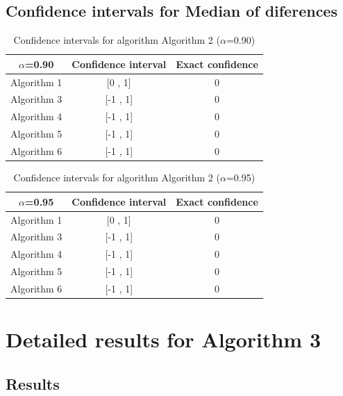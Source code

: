 \documentclass[a4paper,10pt]{article}
\begin{document}
\subsection{Confidence intervals for Median of diferences}

\begin{table}[!htp]
\centering\small
\begin{tabular}{
|c|c|c|}
\hline
 $\alpha$=0.90 & Confidence interval & Exact confidence \\ \hline 
Algorithm 1 & [0 , 1] & 0\\ \hline 
Algorithm 3 & [-1 , 1] & 0\\ \hline 
Algorithm 4 & [-1 , 1] & 0\\ \hline 
Algorithm 5 & [-1 , 1] & 0\\ \hline 
Algorithm 6 & [-1 , 1] & 0\\ \hline 

\end{tabular}
\caption{Confidence intervals for algorithm Algorithm 2 ($\alpha$=0.90)}
\end{table}
\begin{table}[!htp]
\centering\small
\begin{tabular}{
|c|c|c|}
\hline
 $\alpha$=0.95 & Confidence interval & Exact confidence \\ \hline 
Algorithm 1 & [0 , 1] & 0\\ \hline 
Algorithm 3 & [-1 , 1] & 0\\ \hline 
Algorithm 4 & [-1 , 1] & 0\\ \hline 
Algorithm 5 & [-1 , 1] & 0\\ \hline 
Algorithm 6 & [-1 , 1] & 0\\ \hline 

\end{tabular}
\caption{Confidence intervals for algorithm Algorithm 2 ($\alpha$=0.95)}
\end{table}

 \clearpage 


\section{Detailed results for Algorithm 3}


\subsection{Results}
\end{document}
